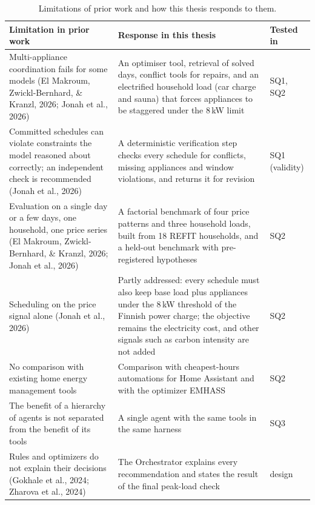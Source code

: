 \documentclass[12pt,a4paper]{report}
\begin{document}
\begin{table}[h!]
\caption{Limitations of prior work and how this thesis responds to them.}
\label{tab:gap}
\small
\begin{tabularx}{\textwidth}{>{\raggedright\arraybackslash}p{4.2cm}>{\raggedright\arraybackslash}X>{\raggedright\arraybackslash}p{1.6cm}}
\toprule
Limitation in prior work & Response in this thesis & Tested in \\
\midrule
Multi-appliance coordination fails for some models (El Makroum,
  Zwickl-Bernhard, \& Kranzl, 2026; Jonah et al., 2026) &
  An optimiser tool, retrieval of solved days, conflict tools for
  repairs, and an electrified household load (car charge and sauna)
  that forces appliances to be staggered under the 8\,kW limit & SQ1,
  SQ2 \\[3pt]
Committed schedules can violate constraints the model reasoned about
  correctly; an independent check is recommended (Jonah et al., 2026) &
  A deterministic verification step checks every schedule for conflicts,
  missing appliances and window violations, and returns it for revision &
  SQ1 (validity) \\[3pt]
Evaluation on a single day or a few days, one household, one price
  series (El Makroum, Zwickl-Bernhard, \& Kranzl, 2026; Jonah et al., 2026) &
  A factorial benchmark of four price patterns and three household
  loads, built from 18 REFIT households, and a held-out benchmark with
  pre-registered hypotheses & SQ2 \\[3pt]
Scheduling on the price signal alone (Jonah et al., 2026) & Partly
  addressed: every schedule must also keep base load plus appliances
  under the 8\,kW threshold of the Finnish power charge; the objective
  remains the electricity cost, and other signals such as carbon
  intensity are not added & SQ2 \\[3pt]
No comparison with existing home energy management tools &
  Comparison with cheapest-hours automations for Home Assistant and
  with the optimizer EMHASS & SQ2 \\[3pt]
The benefit of a hierarchy of agents is not separated from the benefit
  of its tools &
  A single agent with the same tools in the same harness & SQ3 \\[3pt]
Rules and optimizers do not explain their decisions (Gokhale et al.,
  2024; Zharova et al., 2024) &
  The Orchestrator explains every recommendation and states the result
  of the final peak-load check & design \\
\bottomrule
\end{tabularx}
\end{table}
\end{document}
